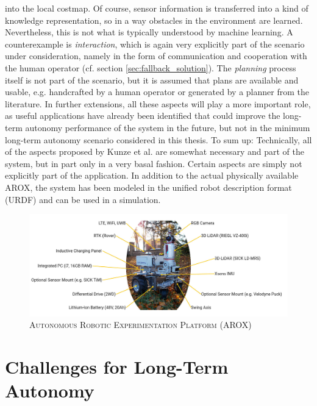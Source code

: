 \documentclass[english, master, utf8]{base/thesis_KBS}
\begin{document}
into the local costmap. Of course,
sensor information is transferred into a kind of knowledge representation, so in a way obstacles in the environment are learned. Nevertheless, this is not what is typically
understood by machine learning. A counterexample is \textit{interaction}, which is again very explicitly part of the scenario under consideration, namely in the form of communication and
cooperation with the human operator (cf. section \ref{sec:fallback_solution}). The \textit{planning} process itself is not part of the scenario, but it is assumed that plans are available and usable,
e.g. handcrafted by a human operator or generated by a planner from the literature. In further extensions, all these aspects will play a more important role, as useful applications
have already been identified that could improve the long-term autonomy performance of the system in the future, but not in the minimum long-term autonomy scenario considered in this
thesis. To sum up: Technically, all of the aspects proposed by Kunze et al. are somewhat necessary and part of the system, but in part only in a very basal fashion. Certain aspects
are simply not explicitly part of the application. In addition to the actual physically available AROX, the system has been modeled in the unified robot description format (URDF) and
can be used in a simulation.
\begin{figure}[H]
    \centering
    \includegraphics[width=\textwidth]{pics/AROX.jpg}
    \caption{\textsc{Autonomous Robotic Experimentation Platform (AROX)}}
    \label{fig:arox_system}
\end{figure}

\section{Challenges for Long-Term Autonomy}
\label{sec:challenges_for_lta}
\end{document}
